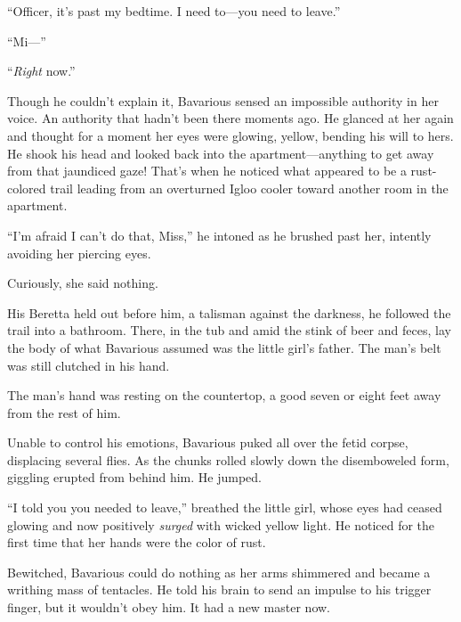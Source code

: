 ``Officer, it's past my bedtime. I need to---you need to
leave.''



``Mi---''



``{\em Right} now.''



Though he couldn't explain it, Bavarious sensed an impossible
authority in her voice. An authority that hadn't been there moments
ago. He glanced at her again and thought for a moment her eyes were
glowing, yellow, bending his will to hers. He shook his head and
looked back into the apartment---anything to get away from that
jaundiced gaze! That's when he noticed what appeared to be a
rust-colored trail leading from an overturned Igloo cooler toward
another room in the apartment.



``I'm afraid I can't do that, Miss,'' he intoned as he brushed past
her, intently avoiding her piercing eyes.



Curiously, she said nothing.



His Beretta held out before him, a talisman against the darkness,
he followed the trail into a bathroom. There, in the tub and amid
the stink of beer and feces, lay the body of what Bavarious assumed
was the little girl's father. The man's belt was still clutched in
his hand.



The man's hand was resting on the countertop, a good seven or eight
feet away from the rest of him.



Unable to control his emotions, Bavarious puked all over the fetid
corpse, displacing several flies. As the chunks rolled slowly down
the disemboweled form, giggling erupted from behind him. He
jumped.



``I told you you needed to leave,'' breathed the little girl, whose
eyes had ceased glowing and now positively {\em surged} with
wicked yellow light. He noticed for the first time that her hands
were the color of rust.



Bewitched, Bavarious could do nothing as her arms shimmered and
became a writhing mass of tentacles. He told his brain to send an
impulse to his trigger finger, but it wouldn't obey him. It had a
new master now.



